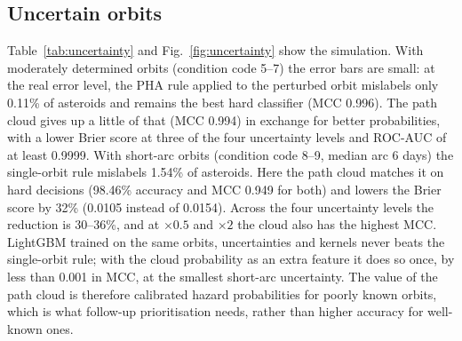 \documentclass[make,article,submit,moreauthors]{Definitions/mdpi}
\begin{document}
\subsection{Uncertain orbits}
Table~\ref{tab:uncertainty} and Fig.~\ref{fig:uncertainty} show the simulation. With moderately determined orbits (condition code 5--7) the error bars are small: at the real error level, the PHA rule applied to the perturbed orbit mislabels only 0.11\% of asteroids and remains the best hard classifier (MCC 0.996). The path cloud gives up a little of that (MCC 0.994) in exchange for better probabilities, with a lower Brier score at three of the four uncertainty levels and ROC-AUC of at least 0.9999. With short-arc orbits (condition code 8--9, median arc 6 days) the single-orbit rule mislabels 1.54\% of asteroids. Here the path cloud matches it on hard decisions (98.46\% accuracy and MCC 0.949 for both) and lowers the Brier score by 32\% (0.0105 instead of 0.0154). Across the four uncertainty levels the reduction is 30--36\%, and at $\times0.5$ and $\times2$ the cloud also has the highest MCC. LightGBM trained on the same orbits, uncertainties and kernels never beats the single-orbit rule; with the cloud probability as an extra feature it does so once, by less than 0.001 in MCC, at the smallest short-arc uncertainty. The value of the path cloud is therefore calibrated hazard probabilities for poorly known orbits, which is what follow-up prioritisation needs, rather than higher accuracy for well-known ones.
\end{document}
